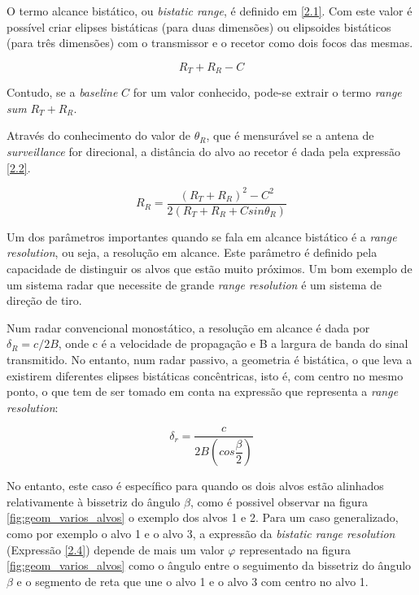 O termo alcance bistático, ou \textit{bistatic range}, é definido em \ref{2.1}. Com este valor é possível criar elipses bistáticas (para duas dimensões) ou elipsoides bistáticos (para três dimensões) com o transmissor e o recetor como dois focos das mesmas. \par

\begin{equation} \label{2.1}
R_{T}+R_{R}-C
\end{equation}

Contudo, se a \textit{baseline} $C$ for um valor conhecido, pode-se extrair o termo \textit{range sum} $R_{T}+R_{R}$. \par
Através do conhecimento do valor de $\theta_{R}$, que é mensurável se a antena de \textit{surveillance} for direcional, a distância do alvo ao recetor é dada pela expressão \ref{2.2}.

\begin{equation} \label{2.2}
R_{R}=\dfrac{\left(  R_{T}+R_{R}\right)^{2}-C^{2}}{2\left(  R_{T}+R_{R}+C sin\theta_{R}\right)}
\end{equation}


Um dos parâmetros importantes quando se fala em alcance bistático é a \textit{range resolution}, ou seja, a resolução em alcance. Este parâmetro é definido pela capacidade de distinguir os alvos que estão muito próximos. Um bom exemplo de um sistema radar que necessite de grande \textit{range resolution} é um sistema de direção de tiro. \par 

Num radar convencional monostático, a resolução em alcance é dada por $\delta_{R}=c/2B$, onde c é a velocidade de propagação e B a largura de banda do sinal transmitido. No entanto, num radar passivo, a geometria é bistática, o que leva a existirem diferentes elipses bistáticas concêntricas, isto é, com centro no mesmo ponto, o que tem de ser tomado em conta na expressão que representa a \textit{range resolution}:

\begin{equation} \label{2.3}
\delta_{r}=\dfrac{c}{2B\left( cos\dfrac{\beta}{2}\right)}
\end{equation}

No entanto, este caso é específico para quando os dois alvos estão alinhados relativamente à bissetriz do ângulo $\beta$, como é possivel observar na figura \ref{fig:geom_varios_alvos} o exemplo dos alvos 1 e 2. Para um caso generalizado, como por exemplo o alvo 1 e o alvo 3, a expressão da \textit{bistatic range resolution} (Expressão \ref{2.4}) depende de mais um valor $\varphi$ representado na figura \ref{fig:geom_varios_alvos} como o ângulo entre o seguimento da bissetriz do ângulo $\beta$ e o segmento de reta que une o alvo 1 e o alvo 3 com centro no alvo 1. 


